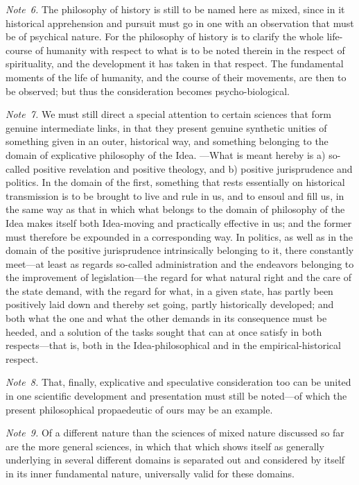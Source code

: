 \documentclass[12pt,a4paper]{book}
\begin{document}
{\small\emph{Note~6.} The philosophy of history is still to be named here as mixed,
since in it historical apprehension and pursuit must go in one with an observation
that must be of psychical nature. For the philosophy of history is to clarify the
whole life-course of humanity with respect to what is to be noted therein in the
respect of spirituality, and the development it has taken in that respect. The
fundamental moments of the life of humanity, and the course of their movements, are
then to be observed; but thus the consideration becomes psycho-biological.\par}

{\small\emph{Note~7.} We must still direct a special attention to certain sciences
that form genuine intermediate links, in that they present genuine synthetic
unities of something given in an outer, historical way, and something belonging to
the domain of explicative philosophy of the Idea. ---What is meant hereby is a)
so-called positive revelation and positive theology, and b) positive jurisprudence
and politics. In the domain of the first, something that rests essentially on
historical transmission is to be brought to live and rule in us, and to ensoul and
fill us, in the same way as that in which what belongs to the domain of philosophy
of the Idea makes itself both Idea-moving and practically effective in us; and the
former must therefore be expounded in a corresponding way. In politics, as well as
in the domain of the positive jurisprudence intrinsically belonging to it, there
constantly meet---at least as regards so-called administration and the endeavors
belonging to the improvement of legislation---the regard for what natural right and
the care of the state demand, with the regard for what, in a given state, has
partly been positively laid down and thereby set going, partly historically
developed; and both what the one and what the other demands in its consequence must
be heeded, and a solution of the tasks sought that can at once satisfy in both
respects---that is, both in the Idea-philosophical and in the empirical-historical
respect.\par}

{\small\emph{Note~8.} That, finally, explicative and speculative consideration too
can be united in one scientific development and presentation must still be
noted---of which the present philosophical propaedeutic of ours may be an
example.\par}

{\small\emph{Note~9.} Of a different nature than the sciences of mixed nature
discussed so far are the more general sciences, in which that which shows itself as
generally underlying in several different domains is separated out and considered
by itself in its inner fundamental nature, universally valid for these
domains.\par}
\end{document}
